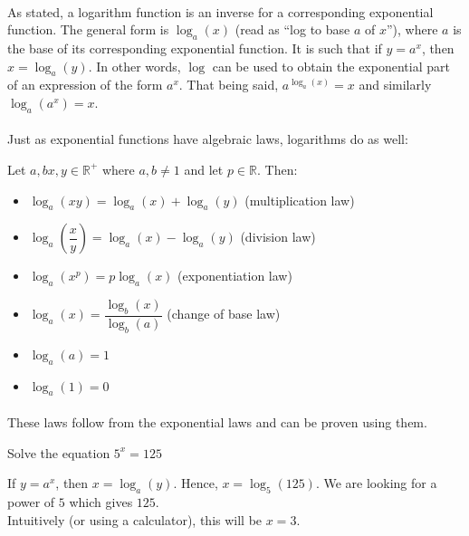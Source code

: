 \documentclass[12pt, a4paper, titlepage, twoside]{article}
\newcommand*{\R}{\mathbb{R}}
\newcounter{excount}[subsection]
\begin{document}
	\paragraph{}
	As stated, a logarithm function is an inverse for a corresponding exponential function. The general form is $\log_a(x)$ (read as
	``log to base $a$ of $x$''), where $a$ is the base of its corresponding exponential function. It is such that if $y = a^x$, then 
	$x = \log_a(y)$. In other words, $\log$ can be used to obtain the exponential part of an expression of the form $a^x$. That being said, 
	$a^{\log_a(x)} = x$ and similarly $\log_a(a^x) = x$.
	
	\paragraph{}
	Just as exponential functions have algebraic laws, logarithms do as well:\\
	
	\begin{kp}
		Let $a, b x, y \in \R^+$ where $a, b \neq 1$ and let $p \in \R$. Then:
		
		\begin{itemize}
			\item $\log_a(xy) = \log_a(x) + \log_a(y)$ (multiplication law)
			\item $ \log_a\left(\dfrac{x}{y}\right) = \log_a(x) - \log_a(y)$ (division law)
			\item $\log_a(x^p) = p \log_a(x)$ (exponentiation law)
			\item $\log_a(x) = \dfrac{\log_b(x)}{\log_b(a)}$ (change of base law)
			\item $\log_a(a) = 1$
			\item $\log_a(1) = 0$
		\end{itemize}
	\end{kp}
	
	\paragraph{}
	These laws follow from the exponential laws and can be proven using them.\\
	
	\begin{ex}
		Solve the equation $5^x = 125$
		
		\hfill
		\tcbline
		\hfill
		
		If $y = a^x$, then $x = \log_a(y)$. Hence, $x = \log_5(125)$. We are looking for a power of $5$ which gives $125$.\\
		
		Intuitively (or using a calculator), this will be $x = 3$. 
	\end{ex}
	
\end{document}
